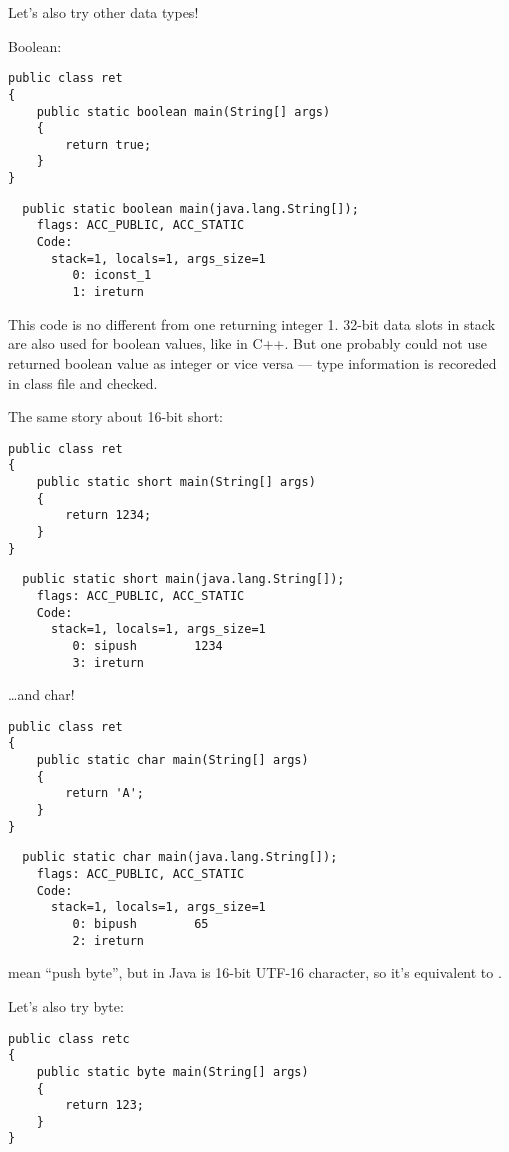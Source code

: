 Let's also try other data types!

Boolean:

\begin{lstlisting}
public class ret
{
	public static boolean main(String[] args) 
	{
		return true;
	}
}
\end{lstlisting}

\begin{lstlisting}
  public static boolean main(java.lang.String[]);
    flags: ACC_PUBLIC, ACC_STATIC
    Code:
      stack=1, locals=1, args_size=1
         0: iconst_1      
         1: ireturn       
\end{lstlisting}

This code is no different from one returning integer 1.
32-bit data slots in stack are also used for boolean values, like in C++.
But one probably could not use returned boolean value as integer or vice versa --- type information
is recoreded in class file and checked.

The same story about 16-bit short:

\begin{lstlisting}
public class ret
{
	public static short main(String[] args) 
	{
		return 1234;
	}
}
\end{lstlisting}

\begin{lstlisting}
  public static short main(java.lang.String[]);
    flags: ACC_PUBLIC, ACC_STATIC
    Code:
      stack=1, locals=1, args_size=1
         0: sipush        1234
         3: ireturn       
\end{lstlisting}

\dots and char!

\begin{lstlisting}
public class ret
{
	public static char main(String[] args) 
	{
		return 'A';
	}
}
\end{lstlisting}

\begin{lstlisting}
  public static char main(java.lang.String[]);
    flags: ACC_PUBLIC, ACC_STATIC
    Code:
      stack=1, locals=1, args_size=1
         0: bipush        65
         2: ireturn       
\end{lstlisting}

 mean ``push byte'', but  in Java is 16-bit UTF-16 character, 
so it's equivalent to .

Let's also try byte:

\begin{lstlisting}
public class retc
{
	public static byte main(String[] args) 
	{
		return 123;
	}
}
\end{lstlisting}

